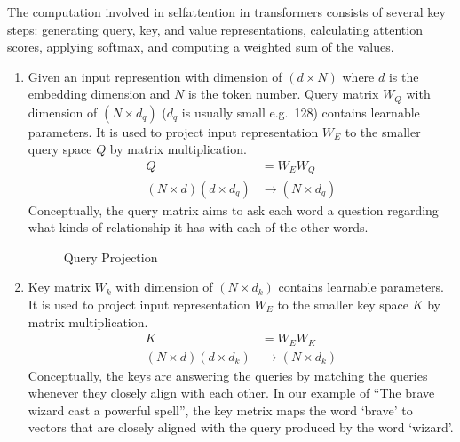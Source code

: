 \documentclass[letterpaper,11pt,english]{sphinxmanual}
\begin{document}
\begin{figure}[htbp]
\centering

\noindent{}
\end{figure}

\sphinxAtStartPar
The computation involved in self\sphinxhyphen{}attention in transformers consists of
several key steps: generating query, key, and value representations,
calculating attention scores, applying softmax, and computing a weighted
sum of the values.
\begin{enumerate}
%
\item {} 
\sphinxAtStartPar
{}

\sphinxAtStartPar
Given an input represention with dimension of \((d \times N)\)
where \(d\) is the embedding dimension and \(N\) is the token
number. Query matrix \(W_Q\) with dimension of
\((N \times d_q)\) (\(d_q\) is usually small e.g. 128)
contains learnable parameters. It is used to project input
representation \(W_E\) to the smaller query space \(Q\) by
matrix multiplication.
\begin{equation*}
\begin{split}Q &= W_E W_Q\\
(N\times d)(d\times d_q) &\rightarrow (N \times d_q)\end{split}
\end{equation*}
\sphinxAtStartPar
Conceptually, the query matrix aims to ask each word a question
regarding what kinds of relationship it has with each of the other
words.

\begin{figure}[htbp]
\centering
\capstart

\noindent{}
\caption{Query Projection}\label{\detokenize{pretraining:id15}}\end{figure}

\item {} 
\sphinxAtStartPar
{}

\sphinxAtStartPar
Key matrix \(W_k\) with dimension of \((N \times d_k)\)
contains learnable parameters. It is used to project input
representation \(W_E\) to the smaller key space \(K\) by
matrix multiplication.
\begin{equation*}
\begin{split}K &= W_E W_K \\
(N \times d) (d \times d_k) &\rightarrow (N \times d_k)\end{split}
\end{equation*}
\sphinxAtStartPar
Conceptually, the keys are answering the queries by matching the
queries whenever they closely align with each other. In our example
of “The brave wizard cast a powerful spell”, the key metrix maps the
word ‘brave’ to vectors that are closely aligned with the query
produced by the word ‘wizard’.


\end{enumerate}
\end{document}
